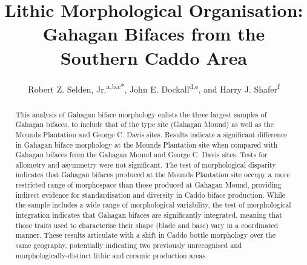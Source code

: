 \documentclass[review]{elsarticle}
\begin{document}
\begin{frontmatter}


\title{Lithic Morphological Organisation: Gahagan Bifaces from the Southern Caddo Area}



\author{Robert Z. Selden, Jr.\textsuperscript{a,b,c*}, John E. Dockall\textsuperscript{d,e}, and Harry J. Shafer\textsuperscript{f}}
\address[1]{Heritage Research Center, Stephen F. Austin State University, United States}
\address[2]{Cultural Heritage Department, Jean Monnet University, France}
\address[3]{ORCID ID \href{http://orcid.org/0000-0002-1789-8449}{0000-0002-1789-8449}}
\address[4]{Prewitt and Associates, Inc., United States}
\address[5]{ORCID ID \href{http://orcid.org/0000-0002-0940-7144}{0000-0002-0940-7144}}
\address[6]{Department of Anthropology, Texas A\&M University, United States}

\begin{abstract}
This analysis of Gahagan biface morphology enlists the three largest samples of Gahagan bifaces, to include that of the type site (Gahagan Mound) as well as the Mounds Plantation and George C. Davis sites. Results indicate a significant difference in Gahagan biface morphology at the Mounds Plantation site when compared with Gahagan bifaces from the Gahagan Mound and George C. Davis sites. Tests for allometry and asymmetry were not significant. The test of morphological disparity indicates that Gahagan bifaces produced at the Mounds Plantation site occupy a more restricted range of morphospace than those produced at Gahagan Mound, providing indirect evidence for standardisation and diversity in Caddo biface production. While the sample includes a wide range of morphological variability, the test of morphological integration indicates that Gahagan bifaces are significantly integrated, meaning that those traits used to characterise their shape (blade and base) vary in a coordinated manner. These results articulate with a shift in Caddo bottle morphology over the same geography, potentially indicating two previously unrecognised and morphologically-distinct lithic and ceramic production areas.
\end{abstract}


\end{frontmatter}
\end{document}
